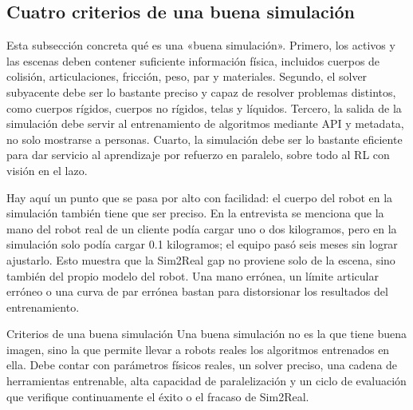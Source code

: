 \documentclass[a4paper]{article}
\begin{document}
\subsection{Cuatro criterios de una buena simulación}

Esta subsección concreta qué es una «buena simulación». Primero, los activos y las escenas deben contener suficiente información física, incluidos cuerpos de colisión, articulaciones, fricción, peso, par y materiales. Segundo, el solver subyacente debe ser lo bastante preciso y capaz de resolver problemas distintos, como cuerpos rígidos, cuerpos no rígidos, telas y líquidos. Tercero, la salida de la simulación debe servir al entrenamiento de algoritmos mediante API y metadata, no solo mostrarse a personas. Cuarto, la simulación debe ser lo bastante eficiente para dar servicio al aprendizaje por refuerzo en paralelo, sobre todo al RL con visión en el lazo.

Hay aquí un punto que se pasa por alto con facilidad: el cuerpo del robot en la simulación también tiene que ser preciso. En la entrevista se menciona que la mano del robot real de un cliente podía cargar uno o dos kilogramos, pero en la simulación solo podía cargar 0.1 kilogramos; el equipo pasó seis meses sin lograr ajustarlo. Esto muestra que la Sim2Real gap no proviene solo de la escena, sino también del propio modelo del robot. Una mano errónea, un límite articular erróneo o una curva de par errónea bastan para distorsionar los resultados del entrenamiento.

\begin{importantbox}{Criterios de una buena simulación}
Una buena simulación no es la que tiene buena imagen, sino la que permite llevar a robots reales los algoritmos entrenados en ella. Debe contar con parámetros físicos reales, un solver preciso, una cadena de herramientas entrenable, alta capacidad de paralelización y un ciclo de evaluación que verifique continuamente el éxito o el fracaso de Sim2Real.
\end{importantbox}
\end{document}
